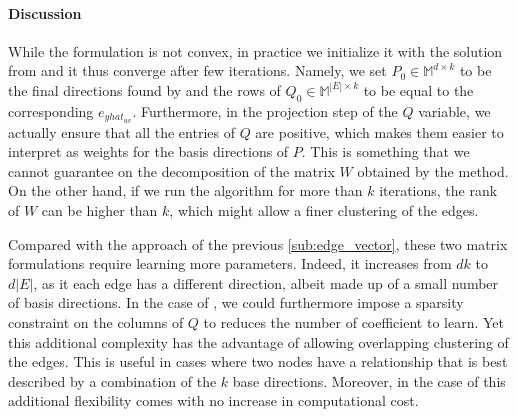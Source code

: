 \paragraph{Discussion}

While the \pqt{} formulation is not convex, in practice we initialize it with the solution from
\combined{} and it thus converge after few iterations. Namely, we set $P_0 \in \mathbb{M}^{d\times
k}$ to be the final directions found by \combined{} and the rows of $Q_0 \in \mathbb{M}^{|E|\times
k}$ to be equal to the corresponding $e_{yhat_{uv}}$. Furthermore, in the projection
step of the $Q$ variable, we actually ensure that all the entries of $Q$ are positive, which makes
them easier to  interpret as weights for the basis directions of $P$. This is something that we
cannot guarantee on the decomposition of the matrix $W$ obtained by the \fwa{} method. On the other
hand, if we run the \fwa{} algorithm for more than $k$ iterations, the rank of $W$ can be higher
than $k$, which might allow a finer clustering of the edges.

Compared with the \combined{} approach of the previous \autoref{sub:edge_vector}, these two matrix
formulations require learning more parameters. Indeed, it increases from $dk$ to $d|E|$, as it each
edge has a different direction, albeit made up of a small number of basis directions. In the case of
\pqt{}, we could furthermore impose a sparsity constraint on the columns of $Q$ to reduces the
number of coefficient to learn. Yet this additional complexity has the advantage of allowing
overlapping clustering of the edges. This is useful in cases where two nodes have a relationship
that is best described by a combination of the $k$ base directions. Moreover, in the case of \fwa{}
this additional flexibility comes with no increase in computational cost.
